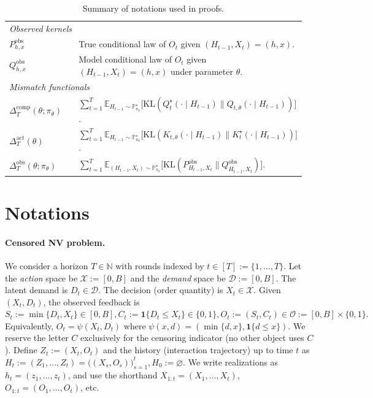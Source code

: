 \documentclass[11pt]{article}
\renewcommand{\P}{\mathbb{P}}
\begin{document}
\begin{table}[t]
\begin{tabular}{p{0.26\linewidth} p{0.70\linewidth}}
\midrule
\multicolumn{2}{l}{\textit{Observed kernels}}\\
$P^{\mathrm{obs}}_{h,x}$ & True conditional law of $O_t$ given $(H_{t-1},X_t)=(h,x)$.\\
$Q^{\mathrm{obs}}_{h,x}$ & Model conditional law of $O_t$ given $(H_{t-1},X_t)=(h,x)$ under parameter $\theta$.\\

\midrule
\multicolumn{2}{l}{\textit{Mismatch functionals}}\\
$\Delta^{\mathrm{comp}}_{T}(\theta;\pi_\theta)$ &
$\sum_{t=1}^T \mathbb{E}_{H_{t-1}\sim \P_{\pi_\theta}^\star}\!\big[\mathrm{KL}(Q_t^\star(\cdot\mid H_{t-1})\|Q_{t,\theta}(\cdot\mid H_{t-1}))\big]$.\\
$\Delta_{T}^{\mathrm{act}}(\theta)$ &
$\sum_{t=1}^T \mathbb{E}_{H_{t-1}\sim \P_{\pi_\theta}^\star}\!\big[\mathrm{KL}(K_{t,\theta}(\cdot\mid H_{t-1})\|K_t^\star(\cdot\mid H_{t-1}))\big]$.\\
$\Delta^{\mathrm{obs}}_{T}(\theta;\pi_\theta)$ &
$\sum_{t=1}^T \mathbb{E}_{(H_{t-1},X_t)\sim \P_{\pi_\theta}^\star}\!\big[\mathrm{KL}(P^{\mathrm{obs}}_{H_{t-1},X_t}\|Q^{\mathrm{obs}}_{H_{t-1},X_t})\big]$.\\
\bottomrule

\end{tabular}
\caption[]{Summary of notations used in proofs.}
\end{table}



\section{Notations}
\label{sec:notation}

\paragraph{Censored NV  problem.}
We consider a horizon $T\in\mathbb{N}$ with rounds indexed by $t\in[T]:=\{1,\dots,T\}$. Let the \emph{action} space be $\mathcal{X}:=[0,B]$ and the \emph{demand} space be $\mathcal{D}:=[0,B]$.
The latent demand is $D_t\in\mathcal{D}$. The decision (order quantity) is $X_t\in\mathcal{X}$. Given $(X_t,D_t)$, the observed feedback is
\(
S_t:=\min\{D_t,X_t\}\in[0,B],
C_t:=\mathbf{1}\{D_t\le X_t\}\in\{0,1\},
O_t:=(S_t,C_t)\in\mathcal{O}:=[0,B]\times\{0,1\}.
\)
Equivalently, $O_t=\psi(X_t,D_t)$ where $\psi(x,d)=(\min\{d,x\},\mathbf{1}\{d\le x\})$.
We reserve the letter $C$ exclusively for the censoring indicator (no other object uses $C$). Define $Z_t:=(X_t,O_t)$ and the history (interaction trajectory) up to time $t$ as
\(H_t:=(Z_1,\dots,Z_t) = \bigl((X_s,O_s)\bigr)_{s=1}^t, H_0:=\varnothing.
\)
We write realizations as $h_t=(z_1,\dots,z_t)$, and use the shorthand $X_{1:t}=(X_1,\dots,X_t)$, $O_{1:t}=(O_1,\dots,O_t)$, etc.
\end{document}
